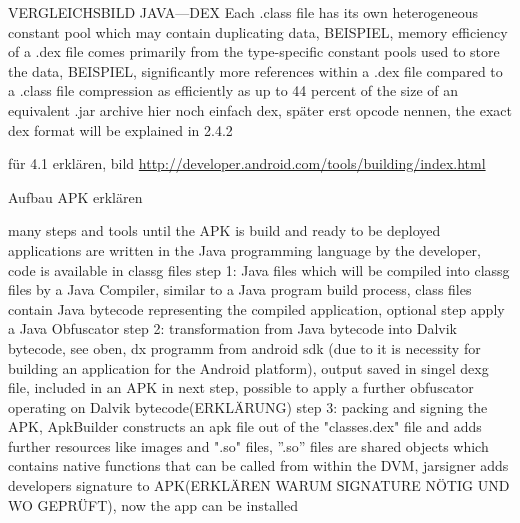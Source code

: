 VERGLEICHSBILD JAVA---DEX\cite{ehringerDalvik}\newline
Each .class file has its own heterogeneous constant pool which may contain duplicating data, BEISPIEL, memory efficiency of a .dex file comes primarily from the type-specific constant pools used to store the data, BEISPIEL,\newline
significantly more references within a .dex file compared to a .class file\cite{ehringerDalvik}\newline
compression as efficiently as up to 44 percent of the size of an equivalent .jar archive\cite{ehringerDalvik}\newline
hier noch einfach dex, später erst opcode nennen, the exact dex format will be explained in 2.4.2\newline

\cite{kovachevaMaster} \cite{ehringerDalvik}
%

für 4.1 erklären, bild
\url{http://developer.android.com/tools/building/index.html}\newline

Aufbau APK erklären\newline

many steps and tools until the APK is build and ready to be deployed\newline
applications are written in the Java programming language by the developer, code is available in \gls{classg} files\newline
step 1:  Java files which will be compiled into \gls{classg} files by a Java Compiler,  similar to a Java program build process, class files contain Java bytecode representing the compiled application, optional step apply a Java Obfuscator\newline
step 2: transformation from Java bytecode into Dalvik bytecode, see oben, dx programm from android sdk (due to it is necessity for building an application for the Android platform), output saved in singel \gls{dexg} file, included in an APK in next step, possible to apply a further obfuscator operating
on Dalvik bytecode(ERKLÄRUNG)\newline
step 3: packing and signing the APK, ApkBuilder constructs an apk file out of the "classes.dex" file and adds further resources like images and ".so" files, ”.so” files are shared objects which contains native functions that can be called from within the DVM, jarsigner adds developers signature to APK(ERKLÄREN WARUM SIGNATURE NÖTIG UND WO GEPRÜFT), now the app can be installed



